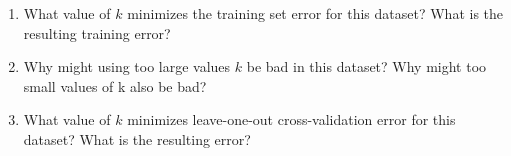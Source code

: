 \documentclass[11pt]{article}
\begin{document}
\begin{enumerate}
    \item {} What value of $k$ minimizes the training set error for this dataset? What is
the resulting training error?
    \item {} Why might using too large values $k$ be bad in this dataset? Why might too
small values of k also be bad?
    \item {} What value of $k$ minimizes leave-one-out cross-validation error for this
dataset? What is the resulting error?
\end{enumerate}

\end{document}

